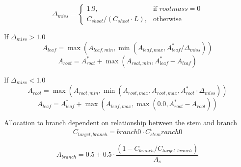 \begin{equation}
	\Delta_{miss}=
	\begin{cases}
	    1.9,& \text{if } root mass = 0 \\
	    C_{shoot}/(C_{shoot} \cdot L),& \text{otherwise}
	\end{cases}
\end{equation}

If $\Delta_{miss} > 1.0$ 
\begin{equation}
	A_{leaf} = \max (A_{leaf,min}, \min (A_{leaf,max}, A_{leaf}^* / \Delta_{miss}))
\end{equation}
\begin{equation}
	A_{root} = A_{root}^* + \max (A_{root,min}, A_{leaf}^* - A_{leaf})
\end{equation}

If $\Delta_{miss} < 1.0$ 
\begin{equation}
	A_{root} = \max (A_{root,min}, \min (A_{root,max},A_{root,max}, A_{root}^* \cdot \Delta_{miss}))
\end{equation}
\begin{equation}
	A_{leaf} = A_{leaf}^* + \max (A_{leaf,max}, \max(0.0, A_{root}^* - A_{root}))
\end{equation}


Allocation to branch dependent on relationship between the stem and branch
\begin{equation}
	C_{target,branch} = branch0 \cdot C_{stem}^branch0
\end{equation}

\begin{equation}
	A_{branch} = 0.5 + 0.5 \cdot \dfrac{(1-C_{branch}/C_{target,branch})}{A_{s}}
\end{equation}

